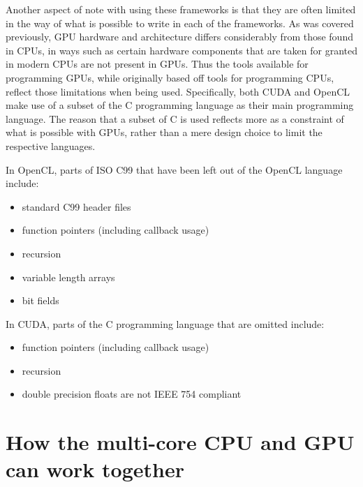 \documentclass[a4paper,11pt]{article}
\begin{document}
Another aspect of note with using these frameworks is that they are often limited in the way of what is possible to write in each
of the frameworks. As was covered previously, GPU hardware and architecture differs considerably from those found in CPUs, in
ways such as certain hardware components that are taken for granted in modern CPUs are not present in GPUs. Thus the tools
available for programming GPUs, while originally based off tools for programming CPUs, reflect those limitations when being
used. Specifically, both CUDA and OpenCL make use of a subset of the C programming language as their main programming language.
The reason that a subset of C is used reflects more as a constraint of what is possible with GPUs, rather than a mere
design choice to limit the respective languages.

In OpenCL, parts of ISO C99 that have been left out of the OpenCL language include:~\cite{slides:KhronosOpenCLOverview}

\begin{itemize}
  \item standard C99 header files
  \item function pointers (including callback usage)
  \item recursion
  \item variable length arrays
  \item bit fields
\end{itemize}

In CUDA, parts of the C programming language that are omitted include:~\cite{slides:CUDAOverview}

\begin{itemize}
  \item function pointers (including callback usage)
  \item recursion
  \item double precision floats are not IEEE 754 compliant
\end{itemize}



\newpage

\section{How the multi-core CPU and GPU can work together} %
\label{sec:parallelism_in_the_multi_core_cpu_and_gpu}
\end{document}
